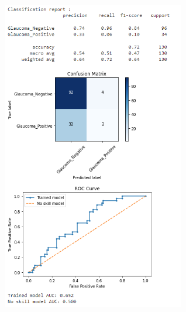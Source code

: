 \documentclass[11pt, a4paper]{article}
\begin{document}
\begin{figure}[H]
\begin{minipage}{.5\textwidth}
  \includegraphics[width=8cm, height=15cm]{imgs/results/results-resnet50-fe.PNG} 
  \label{fig:results-resnet50-fe}
\end{minipage}
\end{figure}
\end{document}
